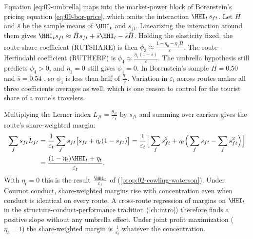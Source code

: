 Equation \eqref{eq:09-umbrella} maps into the market-power block of Borenstein's pricing equation
\eqref{eq:09-bor-price}, which omits the interaction $\HHI_t\,s_{ft}$. Let $\bar H$ and $\bar s$ be the
sample means of $\HHI_t$ and $s_{ft}$. Linearizing the interaction around them gives
$\HHI_ts_{ft}\approx\bar H s_{ft}+\bar s\HHI_t-\bar s\bar H$. Holding the elasticity fixed, the
route-share coefficient (RUTSHARE) is then $\phi_3\approx\frac{1-\eta_0-\eta_1\bar H}{\varepsilon}$. The
route-Herfindahl coefficient (RUTHERF) is $\phi_4\approx\frac{\eta_1(1-\bar s)}{\varepsilon}$. The
umbrella hypothesis still predicts $\phi_4>0$, and $\eta_1=0$ still gives $\phi_4=0$. In Borenstein's
sample $\bar H=0.50$ and $\bar s=0.54$ \citep[Table~4]{Borenstein1989}, so $\phi_4$ is less than half of
$\frac{\eta_1}{\varepsilon}$. Variation in $\varepsilon_t$ across routes makes all three coefficients
averages as well, which is one reason to control for the tourist share of a route's travelers.

Multiplying the Lerner index $L_{ft}=\frac{\theta_{ft}}{\varepsilon_t}$ by $s_{ft}$ and summing over
carriers gives the route's share-weighted margin:
\begin{align}
\sum_f s_{ft}L_{ft}
&=\frac{1}{\varepsilon_t}\sum_f s_{ft}\big[s_{ft}+\eta_t(1-s_{ft})\big]
=\frac{1}{\varepsilon_t}\Big[\sum_f s_{ft}^2+\eta_t\Big(\sum_f s_{ft}-\sum_f s_{ft}^2\Big)\Big]\notag\\
&=\frac{(1-\eta_t)\HHI_t+\eta_t}{\varepsilon_t}.\label{eq:09-cowling}
\end{align}
With $\eta_t=0$ this is the result $\frac{\HHI_t}{\varepsilon_t}$ of \citet{CowlingWaterson1976}
(\cref{prop:02-cowling-waterson}). Under Cournot conduct, share-weighted margins rise with concentration even when
conduct is identical on every route. A cross-route regression of margins on $\HHI_t$ in the
structure-conduct-performance tradition (\cref{ch:intro}) therefore finds a positive slope without any
umbrella effect. Under joint profit maximization ($\eta_t=1$) the share-weighted margin is
$\frac{1}{\varepsilon_t}$ whatever the concentration.


